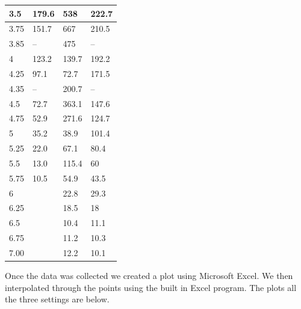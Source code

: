 \documentclass[12pt letterpaper]{article}
\begin{document}
\begin{table}[!htb]
\begin{tabular}{|l|l|l|l|}
3.5                     & 179.6              & 538                  & 222.7               \\ \hline
3.75                    & 151.7              & 667                  & 210.5               \\ \hline
3.85                    & --                 & 475                  & --                  \\ \hline
4                       & 123.2              & 139.7                & 192.2               \\ \hline
4.25                    & 97.1               & 72.7                 & 171.5               \\ \hline
4.35                    & --                 & 200.7                & --                  \\ \hline
4.5                     & 72.7               & 363.1                & 147.6               \\ \hline
4.75                    & 52.9               & 271.6                & 124.7               \\ \hline
5                       & 35.2               & 38.9                 & 101.4               \\ \hline
5.25                    & 22.0               & 67.1                 & 80.4                \\ \hline
5.5                     & 13.0               & 115.4                & 60                  \\ \hline
5.75                    & 10.5               & 54.9                 & 43.5                \\ \hline
6                       &                    & 22.8                 & 29.3                \\ \hline
6.25                    &                    & 18.5                 & 18                  \\ \hline
6.5                     &                    & 10.4                 & 11.1                \\ \hline
6.75                    &                    & 11.2                 & 10.3                \\ \hline
7.00                    &                    & 12.2                 & 10.1                \\ \hline
\end{tabular}
\end{table}

Once the data was collected we created a plot using Microsoft Excel. We then interpolated through the points using the built in Excel program. The plots all the three settings are below. 
\end{document}
